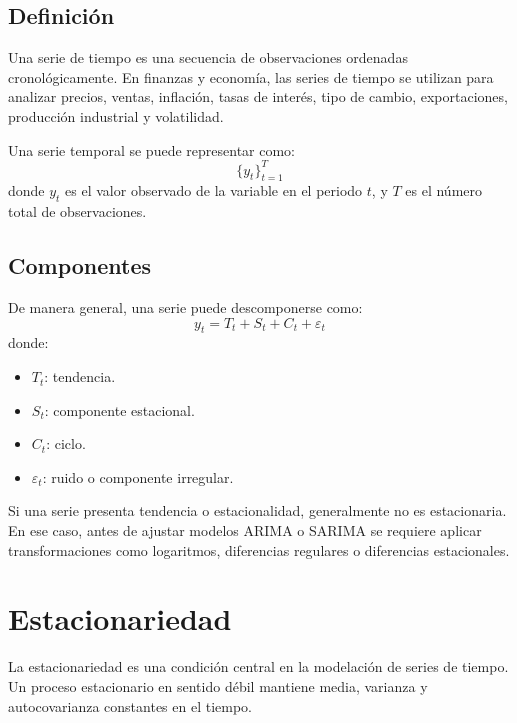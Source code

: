 \documentclass[12pt,a4paper]{article}
\begin{document}
\subsection{Definición}

\begin{markdowncell}
Una serie de tiempo es una secuencia de observaciones ordenadas cronológicamente. En finanzas y economía, las series de tiempo se utilizan para analizar precios, ventas, inflación, tasas de interés, tipo de cambio, exportaciones, producción industrial y volatilidad.
\end{markdowncell}

\begin{latexcell}
Una serie temporal se puede representar como:
\[
\{y_t\}_{t=1}^{T}
\]
donde \(y_t\) es el valor observado de la variable en el periodo \(t\), y \(T\) es el número total de observaciones.
\end{latexcell}

\subsection{Componentes}

\begin{latexcell}
De manera general, una serie puede descomponerse como:
\[
y_t = T_t + S_t + C_t + \varepsilon_t
\]
donde:
\begin{itemize}
    \item \(T_t\): tendencia.
    \item \(S_t\): componente estacional.
    \item \(C_t\): ciclo.
    \item \(\varepsilon_t\): ruido o componente irregular.
\end{itemize}
\end{latexcell}

\begin{interpretacion}
Si una serie presenta tendencia o estacionalidad, generalmente no es estacionaria. En ese caso, antes de ajustar modelos ARIMA o SARIMA se requiere aplicar transformaciones como logaritmos, diferencias regulares o diferencias estacionales.
\end{interpretacion}

\section{Estacionariedad}

\begin{markdowncell}
La estacionariedad es una condición central en la modelación de series de tiempo. Un proceso estacionario en sentido débil mantiene media, varianza y autocovarianza constantes en el tiempo.
\end{markdowncell}
\end{document}
